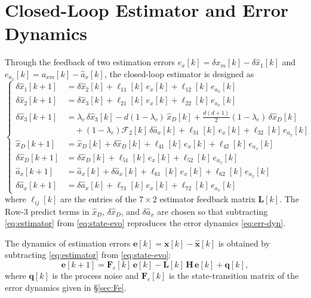 \documentclass[11pt,a4paper]{ctexart}
\newcommand{\lc}{\lambda_c}
\newcommand{\dxm}{\delta x_m}
\newcommand{\axm}{a_{xm}}
\newcommand{\axhat}{\hat a_x}
\newcommand{\xDhat}{\hat x_D}
\newcommand{\Fe}{\mathbf{F}_e}
\newcommand{\HH}{\mathbf{H}}
\newcommand{\LL}{\mathbf{L}}
\newcommand{\xx}{\mathbf{x}}
\newcommand{\xxhat}{\hat{\mathbf{x}}}
\newcommand{\ee}{\mathbf{e}}
\newcommand{\qq}{\mathbf{q}}
\newcommand{\dxonehat}{\delta\hat x_1}
\newcommand{\dxtwohat}{\delta\hat x_2}
\newcommand{\dxthreehat}{\delta\hat x_3}
\newcommand{\dxDhat}{\delta\hat x_D}
\newcommand{\daxhat}{\delta\hat a_x}
\begin{document}
\section{Closed-Loop Estimator and Error Dynamics}
\label{sec:est}

Through the feedback of two estimation errors $e_x[k] = \dxm[k] - \dxonehat[k]$ and $e_{a_x}[k] = \axm[k] - \axhat[k]$, the closed-loop estimator is designed as
\begin{equation}
\left\{\begin{aligned}
\dxonehat[k{+}1]   &= \dxtwohat[k] + \ell_{11}[k]\,e_x[k] + \ell_{12}[k]\,e_{a_x}[k] \\
\dxtwohat[k{+}1]   &= \dxthreehat[k] + \ell_{21}[k]\,e_x[k] + \ell_{22}[k]\,e_{a_x}[k] \\
\dxthreehat[k{+}1] &= \lc\,\dxthreehat[k] - d(1{-}\lc)\,\xDhat[k] + \tfrac{d(d{+}1)}{2}(1{-}\lc)\,\dxDhat[k] \\
                   &\quad + (1{-}\lc)\mathcal{F}_2[k]\,\daxhat[k] + \ell_{31}[k]\,e_x[k] + \ell_{32}[k]\,e_{a_x}[k] \\
\xDhat[k{+}1]      &= \xDhat[k] + \dxDhat[k] + \ell_{41}[k]\,e_x[k] + \ell_{42}[k]\,e_{a_x}[k] \\
\dxDhat[k{+}1]     &= \dxDhat[k] + \ell_{51}[k]\,e_x[k] + \ell_{52}[k]\,e_{a_x}[k] \\
\axhat[k{+}1]      &= \axhat[k] + \daxhat[k] + \ell_{61}[k]\,e_x[k] + \ell_{62}[k]\,e_{a_x}[k] \\
\daxhat[k{+}1]     &= \daxhat[k] + \ell_{71}[k]\,e_x[k] + \ell_{72}[k]\,e_{a_x}[k]
\end{aligned}\right.
\label{eq:estimator}
\end{equation}
where $\ell_{ij}[k]$ are the entries of the $7\times 2$ estimator feedback matrix $\LL[k]$. The Row-3 predict terms in $\xDhat$, $\dxDhat$, and $\daxhat$ are chosen so that subtracting \eqref{eq:estimator} from \eqref{eq:state-evo} reproduces the error dynamics \eqref{eq:err-dyn}.

The dynamics of estimation errors $\ee[k] = \xx[k] - \xxhat[k]$ is obtained by subtracting \eqref{eq:estimator} from \eqref{eq:state-evo}:
\begin{equation}
\ee[k{+}1] = \Fe[k]\,\ee[k] - \LL[k]\,\HH\,\ee[k] + \qq[k],
\label{eq:err-dyn}
\end{equation}
where $\qq[k]$ is the process noise and $\Fe[k]$ is the state-transition matrix of the error dynamics given in \S\ref{sec:Fe}.
\end{document}
